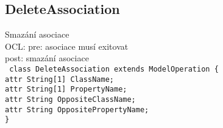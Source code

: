 \documentclass[11pt,a4paper]{article}
\begin{document}
	\subsection{DeleteAssociation}
	Smazání asociace \\
	OCL: pre: asociace musí exitovat \\
	post: smazání asociace \\
	\texttt{
    class DeleteAssociation extends ModelOperation \{ \\
      attr String[1] ClassName; \\
      attr String[1] PropertyName; \\
      attr String OppositeClassName; \\
      attr String OppositePropertyName; \\
    \}
	}								
\end{document}

